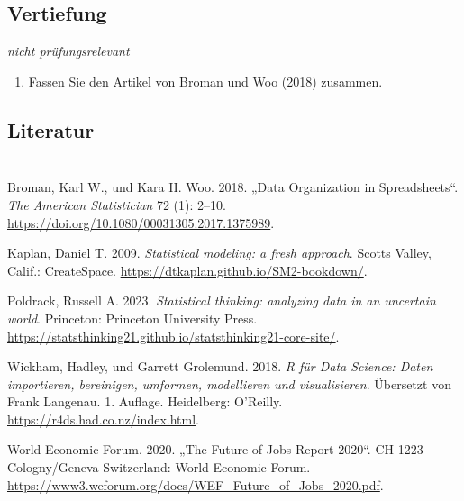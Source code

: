 \documentclass[
  a4paper,
  DIV=11]{scrreprt}
\providecommand{\tightlist}{%
  \setlength{\itemsep}{0pt}\setlength{\parskip}{0pt}}\usepackage{longtable,booktabs,array}
\newlength{\cslhangindent}
\newlength{\cslentryspacingunit} %
\newenvironment{CSLReferences}[2] %
 {%
  \setlength{\parindent}{0pt}
  \ifodd #1
  \let\oldpar\par
  \def\par{\hangindent=\cslhangindent\oldpar}
  \fi
  \setlength{\parskip}{#2\cslentryspacingunit}
 }%
 {}
\theoremstyle{definition}
\theoremstyle{definition}
\theoremstyle{remark}
\begin{document}
\hypertarget{vertiefung}{%
\section{Vertiefung}\label{vertiefung}}

\emph{nicht prüfungsrelevant}

\begin{enumerate}
\def\labelenumi{\arabic{enumi}.}
\tightlist
\item
  Fassen Sie den Artikel von Broman und Woo (2018) zusammen.
\end{enumerate}

\hypertarget{literatur-1}{%
\section{Literatur}\label{literatur-1}}


\hypertarget{section}{%
\chapter{}\label{section}}

\hypertarget{refs}{}
\begin{CSLReferences}{1}{0}
\leavevmode{}%
Broman, Karl W., und Kara H. Woo. 2018. {„Data Organization in
Spreadsheets``}. \emph{The American Statistician} 72 (1): 2--10.
\url{https://doi.org/10.1080/00031305.2017.1375989}.

\leavevmode{}%
Kaplan, Daniel T. 2009. \emph{Statistical modeling: a fresh approach}.
Scotts Valley, Calif.: {CreateSpace}.
\url{https://dtkaplan.github.io/SM2-bookdown/}.

\leavevmode{}%
Poldrack, Russell A. 2023. \emph{Statistical thinking: analyzing data in
an uncertain world}. Princeton: Princeton University Press.
\url{https://statsthinking21.github.io/statsthinking21-core-site/}.

\leavevmode{}%
Wickham, Hadley, und Garrett Grolemund. 2018. \emph{R für Data Science:
Daten importieren, bereinigen, umformen, modellieren und visualisieren}.
Übersetzt von Frank Langenau. 1. Auflage. Heidelberg: O'Reilly.
\url{https://r4ds.had.co.nz/index.html}.

\leavevmode{}%
World Economic Forum. 2020. {„The Future of Jobs Report 2020``}.
{CH}-1223 Cologny/Geneva Switzerland: World Economic Forum.
\url{https://www3.weforum.org/docs/WEF_Future_of_Jobs_2020.pdf}.

\end{CSLReferences}
\end{document}
